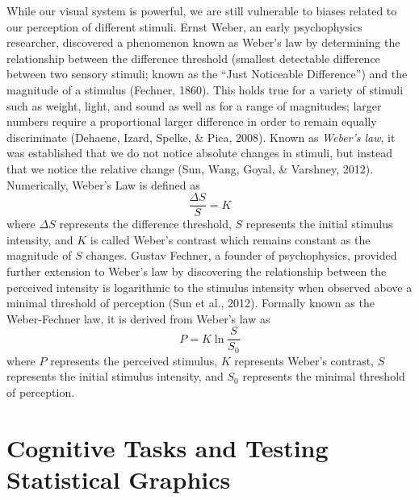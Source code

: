 \documentclass[print]{nuthesis}
\begin{document}
While our visual system is powerful, we are still vulnerable to biases related to our perception of different stimuli.
Ernst Weber, an early psychophysics researcher, discovered a phenomenon known as Weber's law by determining the relationship between the difference threshold (smallest detectable difference between two sensory stimuli; known as the ``Just Noticeable Difference'') and the magnitude of a stimulus (Fechner, 1860).
This holds true for a variety of stimuli such as weight, light, and sound as well as for a range of magnitudes; larger numbers require a proportional larger difference in order to remain equally discriminate (Dehaene, Izard, Spelke, \& Pica, 2008).
Known as \emph{Weber's law}, it was established that we do not notice absolute changes in stimuli, but instead that we notice the relative change (Sun, Wang, Goyal, \& Varshney, 2012).
Numerically, Weber's Law is defined as
\begin{equation}
\frac{\Delta S}{S} = K
\end{equation}
where \(\Delta S\) represents the difference threshold, \(S\) represents the initial stimulus intensity, and \(K\) is called Weber's contrast which remains constant as the magnitude of \(S\) changes.
Gustav Fechner, a founder of psychophysics, provided further extension to Weber's law by discovering the relationship between the perceived intensity is logarithmic to the stimulus intensity when observed above a minimal threshold of perception (Sun et al., 2012).
Formally known as the Weber-Fechner law, it is derived from Weber's law as
\begin{equation}
P = K\ln \frac{S}{S_0}
\end{equation}
where \(P\) represents the perceived stimulus, \(K\) represents Weber's contrast, \(S\) represents the initial stimulus intensity, and \(S_0\) represents the minimal threshold of perception.


\hypertarget{cognitive-tasks-and-testing-statistical-graphics}{%
\section{Cognitive Tasks and Testing Statistical Graphics}\label{cognitive-tasks-and-testing-statistical-graphics}}

\end{document}
